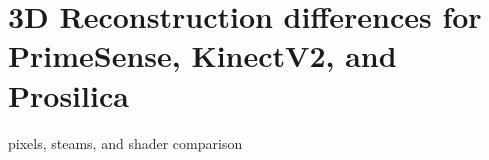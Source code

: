 \section{3D Reconstruction differences for PrimeSense, KinectV2, and Prosilica}
pixels, steams, and shader comparison
%
%
%
%
%
%
%
































